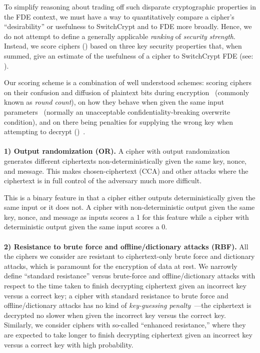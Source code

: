 To simplify reasoning about trading off such disparate cryptographic properties
in the FDE context, we must have a way to quantitatively compare a cipher's
``desirability'' or usefulness to SwitchCrypt and to FDE more broadly. Hence, we
do not attempt to define a generally applicable \textit{ranking} of
\emph{security strength}. Instead, we score ciphers () based on three key security properties that, when summed, give an
estimate of the usefulness of a cipher to SwitchCrypt FDE (see:
).

Our scoring scheme is a combination of well understood schemes: scoring ciphers
on their confusion and diffusion of plaintext bits during
encryption~\cite{MicrosoftCryptanalysisAES,SchneiersOnRounds} (commonly known as
\emph{round count}), on how they behave when given the same input
parameters~\cite{random-output1,Freestyle,random-output2} (normally an
unacceptable confidentiality-breaking overwrite condition), and on there being
penalties for supplying the wrong key when attempting to decrypt ()~\cite{scrypt,Freestyle,others2}.\\
\\
\textbf{1) Output randomization (OR).} A cipher with output randomization
generates different ciphertexts non-deterministically given the same key, nonce,
and message. This makes chosen-ciphertext (CCA) and other attacks where the
ciphertext is in full control of the adversary much more difficult.

This is a binary feature in that a cipher either outputs deterministically given
the same input or it does not. A cipher with non-deterministic output given the
same key, nonce, and message as inputs scores a 1 for this feature while a
cipher with deterministic output given the same input scores a 0.\\
\\
\textbf{2) Resistance to brute force and offline/dictionary attacks (RBF).}
All the ciphers we consider are resistant to ciphertext-only brute force and
dictionary attacks, which is paramount for the encryption of data at rest. We
narrowly define ``standard resistance'' versus brute-force and
offline/dictionary attacks with respect to the time taken to finish decrypting
ciphertext given an incorrect key versus a correct key; a cipher with standard
resistance to brute force and offline/dictionary attacks has no kind of
\emph{key-guessing penalty}~\cite{Freestyle}---the ciphertext is decrypted no
slower when given the incorrect key versus the correct key. Similarly, we
consider ciphers with so-called ``enhanced resistance,'' where they are expected
to take longer to finish decrypting ciphertext given an incorrect key versus a
correct key with high probability.


